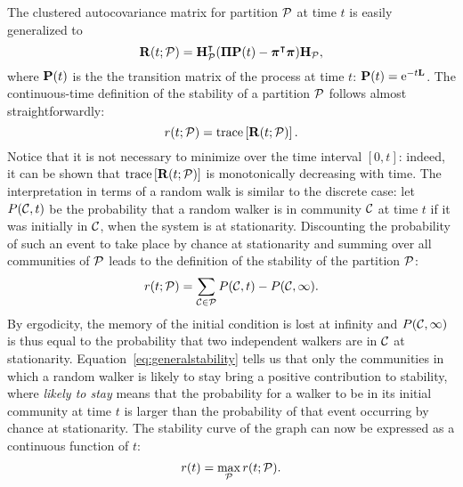 The clustered autocovariance matrix for partition $\P$ at time $t$ is easily generalized to 
\begin{equation}
	\b R(t;\P) = \b H_{\P}^{\t}(\b \Pi\b P(t) - \bs \pi^{\t}\bs \pi)\b H_{\P},
\end{equation}
where $\b P(t)$ is the the transition matrix of the process at time $t$: $\b P(t) = \Exp^{-t\b L}$. The continuous-time definition of the stability of a partition $\P$ follows almost straightforwardly:
\begin{equation}
	r(t;\P) = \trace \left[ \b R(t; \P) \right].
\end{equation}
Notice that it is not necessary to minimize over the time interval $[0,t]$: indeed, it can be shown that $\trace \left[ \b R(t;\P) \right]$ is monotonically decreasing with time. The interpretation in terms of a random walk is similar to the discrete case: let $P(\C,t)$ be the probability that a random walker is in community $\C$ at time $t$ if it was initially in $\C$, when the system is at stationarity. Discounting the probability of such an event to take place by chance at stationarity and summing over all communities of $\P$ leads to the definition of the stability of the partition $\P$:
\begin{equation} \label{eq:generalstability}
	r(t;\P) = \sum_{\C \in \P} P(\C,t) - P(\C,\infty).
\end{equation}
By ergodicity, the memory of the initial condition is lost at infinity and $P(\C,\infty)$ is thus equal to the probability that two independent walkers are in $\C$ at stationarity. Equation~\eqref{eq:generalstability} tells us that only the communities in which a random walker is likely to stay bring a positive contribution to stability, where \textit{likely to stay} means that the probability for a walker to be in its initial community at time $t$ is larger than the probability of that event occurring by chance at stationarity. The stability curve of the graph can now be expressed as a continuous function of $t$:
\begin{equation}
	r(t) = \max_{\P} r(t;\P).
\end{equation}